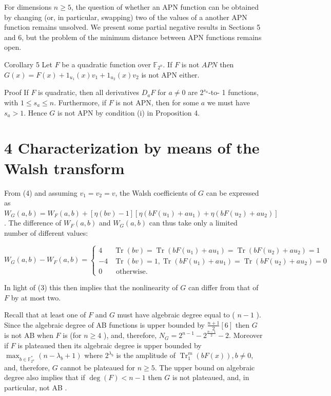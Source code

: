 \documentclass[10pt]{article}
\begin{document}
For dimensions $n \geq 5$, the question of whether an APN function can be obtained by changing (or, in particular, swapping) two of the values of a another APN function remains unsolved. We present some partial negative results in Sections 5 and 6, but the problem of the minimum distance between APN functions remains open.

Corollary 5 Let $F$ be a quadratic function over $\mathbb{F}_{2^{n}}$. If $F$ is not $A P N$ then $G(x)=F(x)+ 1_{u_{1}}(x) v_{1}+1_{u_{2}}(x) v_{2}$ is not APN either.

Proof If $F$ is quadratic, then all derivatives $D_{a} F$ for $a \neq 0$ are $2^{s_{a}}$-to- 1 functions, with $1 \leq s_{a} \leq n$. Furthermore, if $F$ is not APN, then for some $a$ we must have $s_{a}>1$. Hence $G$ is not APN by condition (i) in Proposition 4.

\section*{4 Characterization by means of the Walsh transform}
From (4) and assuming $v_{1}=v_{2}=v$, the Walsh coefficients of $G$ can be expressed as $W_{G}(a, b)=W_{F}(a, b)+[\eta(b v)-1]\left[\eta\left(b F\left(u_{1}\right)+a u_{1}\right)+\eta\left(b F\left(u_{2}\right)+a u_{2}\right)\right]$. The difference of $W_{F}(a, b)$ and $W_{G}(a, b)$ can thus take only a limited number of different values:

\[
W_{G}(a, b)-W_{F}(a, b)= \begin{cases}4 & \operatorname{Tr}(b v)=\operatorname{Tr}\left(b F\left(u_{1}\right)+a u_{1}\right)=\operatorname{Tr}\left(b F\left(u_{2}\right)+a u_{2}\right)=1  \tag{6}\\ -4 & \operatorname{Tr}(b v)=1, \operatorname{Tr}\left(b F\left(u_{1}\right)+a u_{1}\right)=\operatorname{Tr}\left(b F\left(u_{2}\right)+a u_{2}\right)=0 \\ 0 & \text { otherwise. }\end{cases}
\]

In light of (3) this then implies that the nonlinearity of $G$ can differ from that of $F$ by at most two.

Recall that at least one of $F$ and $G$ must have algebraic degree equal to ( $n-1$ ). Since the algebraic degree of AB functions is upper bounded by $\frac{n+1}{2}[6]$ then $G$ is not AB when $F$ is (for $n \geq 4$ ), and, therefore, $N_{G}=2^{n-1}-2^{\frac{n-1}{2}}-2$. Moreover if $F$ is plateaued then its algebraic degree is upper bounded by $\max _{b \in \mathbb{F}_{2^{n}}^{*}}\left(n-\lambda_{b}+1\right)$ where $2^{\lambda_{b}}$ is the amplitude of $\operatorname{Tr}_{1}^{m}(b F(x)), b \neq 0$, and, therefore, $G$ cannot be plateaued for $n \geq 5$. The upper bound on algebraic degree also implies that if $\operatorname{deg}(F)<n-1$ then $G$ is not plateaued, and, in particular, not AB .
\end{document}

